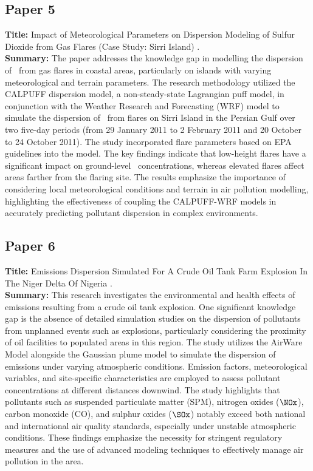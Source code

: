 \subsection*{Paper 5}
\textbf{Title:} Impact of Meteorological Parameters on Dispersion Modeling of Sulfur Dioxide from Gas Flares (Case Study: Sirri Island) \cite{mirrezaei2019impact}.\\
\textbf{Summary:} The paper addresses the knowledge gap in modelling the dispersion of \SOtwo\ from gas flares in coastal areas, particularly on islands with varying meteorological and terrain parameters. The research methodology utilized the CALPUFF dispersion model, a non-steady-state Lagrangian puff model, in conjunction with the Weather Research and Forecasting (WRF) model to simulate the dispersion of \SOtwo\ from flares on Sirri Island in the Persian Gulf over two five-day periods (from
29 January 2011 to 2 February 2011 and 20 October to 24
October 2011). The study incorporated flare parameters based on EPA guidelines into the model. The key findings indicate that low-height flares have a significant impact on ground-level \SOtwo\ concentrations, whereas elevated flares affect areas farther from the flaring site. The results emphasize the importance of considering local meteorological conditions and terrain in air pollution modelling, highlighting the effectiveness of coupling the CALPUFF-WRF models in accurately predicting pollutant dispersion in complex environments.

\subsection*{Paper 6}
\textbf{Title:} Emissions Dispersion Simulated For A Crude Oil Tank Farm Explosion In The Niger Delta Of Nigeria \cite{edeemissions}.\\ 
\textbf{Summary:} This research investigates the environmental and health effects of emissions resulting from a crude oil tank explosion. One significant knowledge gap is the absence of detailed simulation studies on the dispersion of pollutants from unplanned events such as explosions, particularly considering the proximity of oil facilities to populated areas in this region. The study utilizes the AirWare Model alongside the Gaussian plume model to simulate the dispersion of emissions under varying atmospheric conditions. Emission factors, meteorological variables, and site-specific characteristics are employed to assess pollutant concentrations at different distances downwind. The study highlights that pollutants such as suspended particulate matter (SPM), nitrogen oxides (\(\NOx\)), carbon monoxide (CO), and sulphur oxides (\(\SOx\)) notably exceed both national and international air quality standards, especially under unstable atmospheric conditions. These findings emphasize the necessity for stringent regulatory measures and the use of advanced modeling techniques to effectively manage air pollution in the area.

